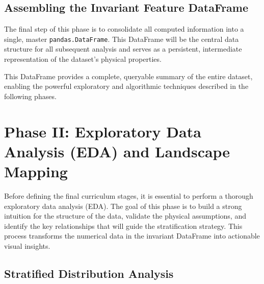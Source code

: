 \documentclass[11pt, letterpaper]{article}
\begin{document}
\subsection{Assembling the Invariant Feature DataFrame}

The final step of this phase is to consolidate all computed information into a single, master \texttt{pandas.DataFrame}. This DataFrame will be the central data structure for all subsequent analysis and serves as a persistent, intermediate representation of the dataset's physical properties.

\begin{table}[H]
\centering
\caption{Recommended structure for the Invariant Feature DataFrame.}
\label{tab:dataframe}
\end{table}

This DataFrame provides a complete, queryable summary of the entire dataset, enabling the powerful exploratory and algorithmic techniques described in the following phases.

\section{Phase II: Exploratory Data Analysis (EDA) and Landscape Mapping}

Before defining the final curriculum stages, it is essential to perform a thorough exploratory data analysis (EDA). The goal of this phase is to build a strong intuition for the structure of the data, validate the physical assumptions, and identify the key relationships that will guide the stratification strategy. This process transforms the numerical data in the invariant DataFrame into actionable visual insights.

\subsection{Stratified Distribution Analysis}
\end{document}
